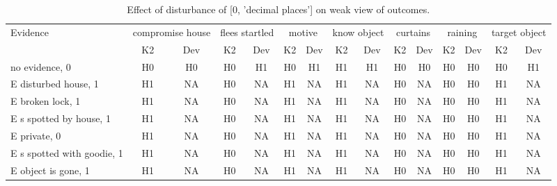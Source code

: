 \begin{table}\begin{tabular}{l|cc|cc|cc|cc|cc|cc|cc}\toprule\multirow{2}{*}{Evidence} & \multicolumn{2}{c}{compromise house}& \multicolumn{2}{c}{flees startled}& \multicolumn{2}{c}{motive}& \multicolumn{2}{c}{know object}& \multicolumn{2}{c}{curtains}& \multicolumn{2}{c}{raining}& \multicolumn{2}{c}{target object}\\& {K2} & {Dev}& {K2} & {Dev}& {K2} & {Dev}& {K2} & {Dev}& {K2} & {Dev}& {K2} & {Dev}& {K2} & {Dev}\\\midrule
no evidence, 0 & H0&H0&\cellcolor{Bittersweet}H0&\cellcolor{Bittersweet}H1&\cellcolor{Bittersweet}H0&\cellcolor{Bittersweet}H1&H1&H1&H0&H0&H0&H0&\cellcolor{Bittersweet}H0&\cellcolor{Bittersweet}H1\\E disturbed house, 1 & \cellcolor{Bittersweet}H1&\cellcolor{Bittersweet}NA&\cellcolor{Bittersweet}H0&\cellcolor{Bittersweet}NA&\cellcolor{Bittersweet}H1&\cellcolor{Bittersweet}NA&\cellcolor{Bittersweet}H1&\cellcolor{Bittersweet}NA&\cellcolor{Bittersweet}H0&\cellcolor{Bittersweet}NA&H0&H0&\cellcolor{Bittersweet}H1&\cellcolor{Bittersweet}NA\\E broken lock, 1 & \cellcolor{Bittersweet}H1&\cellcolor{Bittersweet}NA&\cellcolor{Bittersweet}H0&\cellcolor{Bittersweet}NA&\cellcolor{Bittersweet}H1&\cellcolor{Bittersweet}NA&\cellcolor{Bittersweet}H1&\cellcolor{Bittersweet}NA&\cellcolor{Bittersweet}H0&\cellcolor{Bittersweet}NA&H0&H0&\cellcolor{Bittersweet}H1&\cellcolor{Bittersweet}NA\\E s spotted by house, 1 & \cellcolor{Bittersweet}H1&\cellcolor{Bittersweet}NA&\cellcolor{Bittersweet}H0&\cellcolor{Bittersweet}NA&\cellcolor{Bittersweet}H1&\cellcolor{Bittersweet}NA&\cellcolor{Bittersweet}H1&\cellcolor{Bittersweet}NA&\cellcolor{Bittersweet}H0&\cellcolor{Bittersweet}NA&H0&H0&\cellcolor{Bittersweet}H1&\cellcolor{Bittersweet}NA\\E private, 0 & \cellcolor{Bittersweet}H1&\cellcolor{Bittersweet}NA&\cellcolor{Bittersweet}H0&\cellcolor{Bittersweet}NA&\cellcolor{Bittersweet}H1&\cellcolor{Bittersweet}NA&\cellcolor{Bittersweet}H1&\cellcolor{Bittersweet}NA&\cellcolor{Bittersweet}H0&\cellcolor{Bittersweet}NA&H0&H0&\cellcolor{Bittersweet}H1&\cellcolor{Bittersweet}NA\\E s spotted with goodie, 1 & \cellcolor{Bittersweet}H1&\cellcolor{Bittersweet}NA&\cellcolor{Bittersweet}H0&\cellcolor{Bittersweet}NA&\cellcolor{Bittersweet}H1&\cellcolor{Bittersweet}NA&\cellcolor{Bittersweet}H1&\cellcolor{Bittersweet}NA&\cellcolor{Bittersweet}H0&\cellcolor{Bittersweet}NA&H0&H0&\cellcolor{Bittersweet}H1&\cellcolor{Bittersweet}NA\\E object is gone, 1 & \cellcolor{Bittersweet}H1&\cellcolor{Bittersweet}NA&\cellcolor{Bittersweet}H0&\cellcolor{Bittersweet}NA&\cellcolor{Bittersweet}H1&\cellcolor{Bittersweet}NA&\cellcolor{Bittersweet}H1&\cellcolor{Bittersweet}NA&\cellcolor{Bittersweet}H0&\cellcolor{Bittersweet}NA&H0&H0&\cellcolor{Bittersweet}H1&\cellcolor{Bittersweet}NA\\\bottomrule\end{tabular}\caption{Effect of disturbance of [0, 'decimal places'] on weak view of outcomes.}\end{table}
